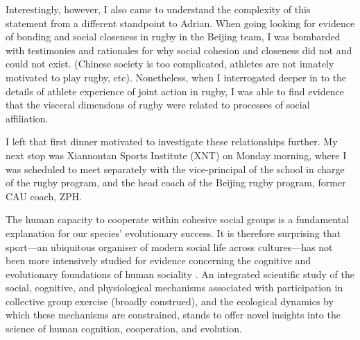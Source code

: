 Interestingly, however, I also came to understand the complexity of this statement from a different standpoint to Adrian.  When going looking for evidence of bonding and social closeness in rugby in the Beijing team, I was bombarded with testimonies and rationales for why social cohesion and closeness did not and could not exist.  (Chinese society is too complicated, athletes are not innately motivated to play rugby, etc).  Nonetheless, when I interrogated deeper in to the details of athlete experience of joint action in rugby, I was able to find evidence that the visceral dimensions of rugby were related to processes of social affiliation.

I left that first dinner motivated to investigate these relationships further.  My next stop was Xiannontan Sports Institute (XNT) on Monday morning, where I was scheduled to meet separately with the vice-principal of the school in charge of the rugby program, and the head coach of the Beijing rugby program, former CAU coach, ZPH.







































The human capacity to cooperate within cohesive social groups is a fundamental explanation for our species' evolutionary success.  It is therefore surprising that sport---an ubiquitous organiser of modern social life across cultures---has not been more intensively studied for evidence concerning the cognitive and evolutionary foundations of human sociality \citep{Blanchard1995,Downey2005a}.  An integrated scientific study of the social, cognitive, and physiological mechanisms associated with participation in collective group exercise (broadly construed), and the ecological dynamics by which these mechanisms are constrained, stands to offer novel insights into the science of human cognition, cooperation, and evolution.

